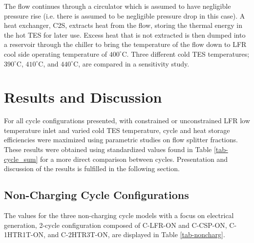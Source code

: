 \begin{paracol}{2}
\linenumbers
\switchcolumn

The flow continues through a circulator which is assumed to have negligible pressure rise (i.e. there is assumed to be negligible pressure drop in this case). A heat exchanger, C2S, extracts heat from the flow, storing the thermal energy in the hot TES for later use. Excess heat that is not extracted is then dumped into a reservoir through the chiller to bring the temperature of the flow down to LFR cool side operating temperature of $400^{\circ}$C. Three different cold TES temperatures; $390^{\circ}$C, $410^{\circ}$C, and $440^{\circ}$C, are compared in a sensitivity study. 



\section{Results and Discussion}

For all cycle configurations presented, with constrained or unconstrained LFR low temperature inlet and varied cold TES temperature, cycle and heat storage efficiencies were maximized using parametric studies on flow splitter fractions. These results were obtained using standardized values found in Table \ref{tab-cycle_sum} for a more direct comparison between cycles. Presentation and discussion of the results is fulfilled in the following section. 

\subsection{Non-Charging Cycle Configurations}

The values for the three non-charging cycle models with a focus on electrical generation, 2-cycle configuration composed of C-LFR-ON and C-CSP-ON, C-1HTR1T-ON, and C-2HTR3T-ON, are displayed in Table \ref{tab-noncharg}. 

\end{paracol}
